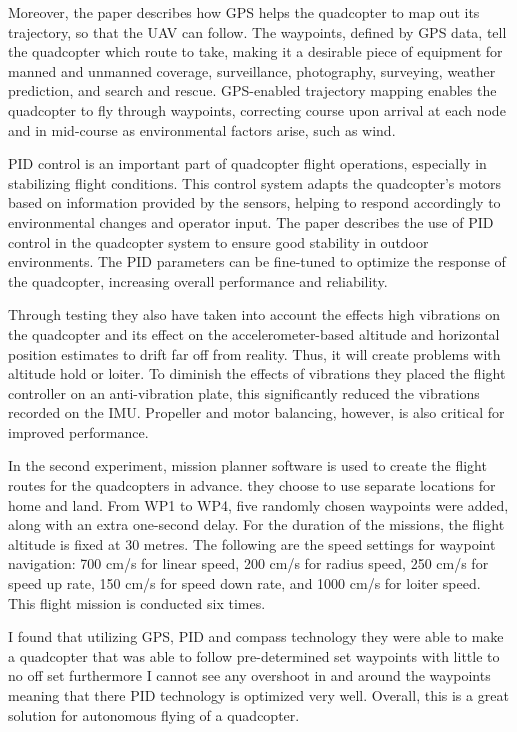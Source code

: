 \documentclass{article}
\begin{document}
Moreover, the paper describes how GPS helps the quadcopter to map out its trajectory, so that the UAV can follow. The waypoints, defined by GPS data, tell the quadcopter which route to take, making it a desirable piece of equipment for manned and unmanned coverage, surveillance, photography, surveying, weather prediction, and search and rescue. GPS-enabled trajectory mapping enables the quadcopter to fly through waypoints, correcting course upon arrival at each node and in mid-course as environmental factors arise, such as wind.

PID control is an important part of quadcopter flight operations, especially in stabilizing flight conditions. This control system adapts the quadcopter's motors based on information provided by the sensors, helping to respond accordingly to environmental changes and operator input. The paper describes the use of PID control in the quadcopter system to ensure good stability in outdoor environments. The PID parameters can be fine-tuned to optimize the response of the quadcopter, increasing overall performance and reliability.

Through testing they also have taken into account the effects high vibrations on the quadcopter and its effect on the accelerometer-based altitude and horizontal position estimates to drift far off from reality. Thus, it will create problems with altitude hold or loiter. To diminish the effects of vibrations they placed the flight controller on an anti-vibration plate, this significantly reduced the vibrations recorded on the IMU. Propeller and motor balancing, however, is also critical for improved performance.

In the second experiment, mission planner software is used to create the flight routes for the quadcopters in advance. they choose to use separate locations for home and land. From WP1 to WP4, five randomly chosen waypoints were added, along with an extra one-second delay. For the duration of the missions, the flight altitude is fixed at 30 metres. The following are the speed settings for waypoint navigation: 700 cm/s for linear speed, 200 cm/s for radius speed, 250 cm/s for speed up rate, 150 cm/s for speed down rate, and 1000 cm/s for loiter speed. This flight mission is conducted six times.

I found that utilizing GPS, PID and compass technology they were able to make a quadcopter that was able to follow pre-determined set waypoints with little to no off set furthermore I cannot see any overshoot in and around the waypoints meaning that there PID technology is optimized very well. Overall, this is a great solution for autonomous flying of a quadcopter.
\end{document}
